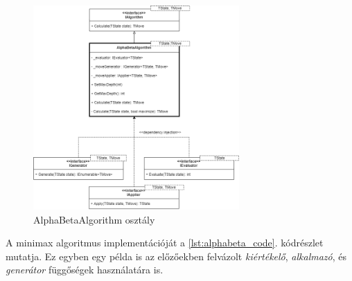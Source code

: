 \documentclass[twoside, a4paper, 12pt]{article}
\begin{document}
\begin{figure}[htbp]
	\centering
	\includegraphics[width=0.7\textwidth]{img/alphabetaAbstractDiagram.png}
	\caption{AlphaBetaAlgorithm osztály}
	\label{fig:alphaBetaAbstractDiagram}
\end{figure}

A minimax algoritmus implementációját a \ref{lst:alphabeta_code}. kódrészlet mutatja. Ez egyben egy példa is az előzőekben felvázolt \textit{kiértékelő}, \textit{alkalmazó}, és \textit{generátor} függőségek használatára is.
\end{document}
